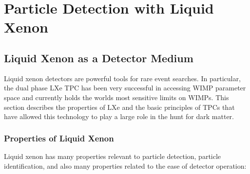 \chapter{Particle Detection with Liquid Xenon}

\label{ch:LXeTPCs} 

\section{Liquid Xenon as a Detector Medium}
Liquid xenon detectors are powerful tools for rare event searches. In particular, the dual phase \ac{LXe} \ac{TPC} has been very successful in accessing \ac{WIMP} parameter space and currently holds the worlds most sensitive limits on \ac{WIMP}s. This section describes the properties of \ac{LXe} and the basic principles of \ac{TPC}s that have allowed this technology to play a large role in the hunt for dark matter.

\subsection{Properties of Liquid Xenon}
Liquid xenon has many properties relevant to particle detection, particle identification, and also many properties related to the ease of detector operation:

